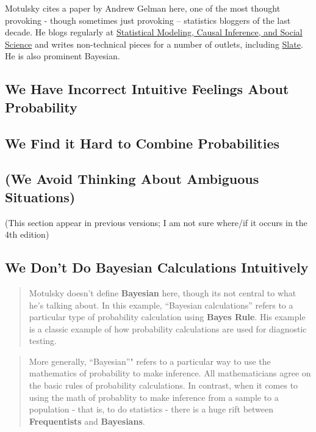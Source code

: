 \documentclass[]{book}
\theoremstyle{definition}
\theoremstyle{definition}
\theoremstyle{definition}
\theoremstyle{remark}
\begin{document}
Motulsky cites a paper by Andrew Gelman here, one of the most thought
provoking - though sometimes just provoking -- statistics bloggers of
the last decade. He blogs regularly at
\href{http://andrewgelman.com/}{Statistical Modeling, Causal Inference,
and Social Science} and writes non-technical pieces for a number of
outlets, including
\href{http://www.slate.com/authors.andrew_gelman.html}{Slate}. He is
also prominent Bayesian.

\subsection{We Have Incorrect Intuitive Feelings About
Probability}\label{we-have-incorrect-intuitive-feelings-about-probability}

\subsection{We Find it Hard to Combine
Probabilities}\label{we-find-it-hard-to-combine-probabilities}

\subsection{(We Avoid Thinking About Ambiguous
Situations)}\label{we-avoid-thinking-about-ambiguous-situations}

(This section appear in previous versions; I am not sure where/if it
occurs in the 4th edition)

\subsection{We Don't Do Bayesian Calculations
Intuitively}\label{we-dont-do-bayesian-calculations-intuitively}

\begin{quote}
Motulsky doesn't define \textbf{Bayesian} here, though its not central
to what he's talking about. In this example, ``Bayesian calculations''
refers to a particular type of probability calculation using
\textbf{Bayes Rule}. His example is a classic example of how probability
calculations are used for diagnostic testing.
\end{quote}

\begin{quote}
More generally, ``Bayesian''" refers to a particular way to use the
mathematics of probability to make inference. All mathematicians agree
on the basic rules of probability calculations. In contrast, when it
comes to using the math of probablity to make inference from a sample to
a population - that is, to do statistics - there is a huge rift between
\textbf{Frequentists} and \textbf{Bayesians}.
\end{quote}
\end{document}
